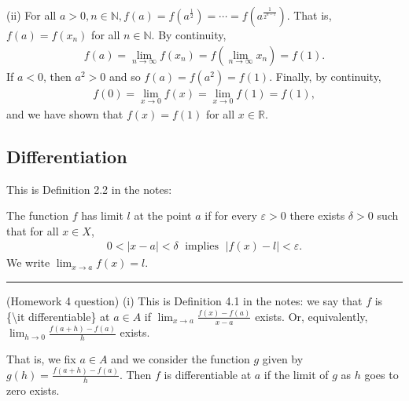 \documentclass[letterpaper,10pt,english]{jupyterBook}
\begin{document}
\sphinxAtStartPar
(ii) For all \(a>0, n\in\mathbb{N}, f(a) = f\left(a^{\frac{1}{2}}\right) = \cdots = f\left(a^{\frac{1}{2^{n-1}}}\right)\). That is, \(f(a)=f(x_n)\) for all \(n\in\mathbb{N}\). By continuity,
\begin{equation*}
\begin{split}
f(a) = \lim_{n\rightarrow\infty} f(x_n) = f\left(\lim_{n\rightarrow\infty} x_n\right) = f(1).
\end{split}
\end{equation*}
\sphinxAtStartPar
If \(a<0\), then \(a^2>0\) and so \(f(a)=f\left(a^2\right)=f(1)\). Finally, by continuity,
\begin{equation*}
\begin{split}
f(0)=\lim_{x\rightarrow 0}f(x) = \lim_{x\rightarrow 0}f(1) = f(1),
\end{split}
\end{equation*}
\sphinxAtStartPar
and we have shown that \(f(x)=f(1)\) for all \(x\in\mathbb{R}\).


\subsection{Differentiation}
\label{\detokenize{Solutions-full:differentiation}}
\sphinxAtStartPar
{\hyperref[\detokenize{Problems:id37}]{}} This is Definition 2.2 in the notes:

The function \(f\) has limit \(l\) at the point \(a\) if for every \(\varepsilon>0\) there exists \(\delta>0\) such that for all \(x\in X\),
\begin{equation*}
\begin{split}
0<|x-a|<\delta \; \text{ implies } \; |f(x)-l|<\varepsilon.
\end{split}
\end{equation*}
\sphinxAtStartPar
We write \(\lim_{x\to a}f(x)=l\).


\bigskip\hrule\bigskip


\sphinxAtStartPar
{\hyperref[\detokenize{Problems:id38}]{}} (Homework 4 question)
(i) This is Definition 4.1 in the notes: we say that \(f\) is \{\textbackslash{}it differentiable\} at \(a \in A\) if \( \lim_{x \rightarrow a}\frac{f(x) - f(a)}{x - a}\) exists. Or, equivalently, \( \lim_{h \rightarrow 0}\frac{f(a +h) - f(a)}{h}\) exists.

That is, we fix \(a\in A\) and we consider the function \(g\) given by \(g(h)=\frac{f(a +h) - f(a)}{h}\). Then \(f\) is differentiable at \(a\) if the limit of \(g\) as \(h\) goes to zero exists.
\end{document}

